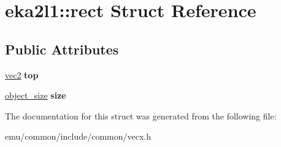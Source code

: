 \hypertarget{structeka2l1_1_1rect}{}\section{eka2l1\+:\+:rect Struct Reference}
\label{structeka2l1_1_1rect}
\subsection*{Public Attributes}
\begin{DoxyCompactItemize}
\item 
\mbox{\label{structeka2l1_1_1rect_a791466dfcd4e52ab031caa22eb8042d6}} 
\mbox{\hyperlink{structeka2l1_1_1vec2}{vec2}} {\bfseries top}
\item 
\mbox{\label{structeka2l1_1_1rect_ac0db433b8fde62de1f28e8e48a10114d}} 
\mbox{\hyperlink{structeka2l1_1_1object__size}{object\+\_\+size}} {\bfseries size}
\end{DoxyCompactItemize}


The documentation for this struct was generated from the following file\+:\begin{DoxyCompactItemize}
\item 
emu/common/include/common/vecx.\+h\end{DoxyCompactItemize}
